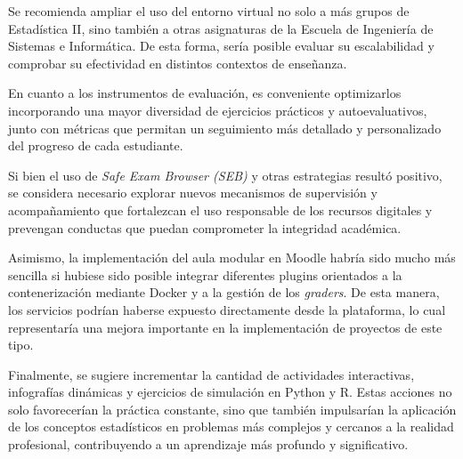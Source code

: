 \documentclass[letter,oneside,12pt,spanish]{report}
\begin{document}
Se recomienda ampliar el uso del entorno virtual no solo a más grupos de Estadística II, sino también a otras asignaturas de la Escuela de Ingeniería de Sistemas e Informática. De esta forma, sería posible evaluar su escalabilidad y comprobar su efectividad en distintos contextos de enseñanza.

En cuanto a los instrumentos de evaluación, es conveniente optimizarlos incorporando una mayor diversidad de ejercicios prácticos y autoevaluativos, junto con métricas que permitan un seguimiento más detallado y personalizado del progreso de cada estudiante.

Si bien el uso de \textit{Safe Exam Browser (SEB)} y otras estrategias resultó positivo, se considera necesario explorar nuevos mecanismos de supervisión y acompañamiento que fortalezcan el uso responsable de los recursos digitales y prevengan conductas que puedan comprometer la integridad académica.

Asimismo, la implementación del aula modular en Moodle habría sido mucho más sencilla si hubiese sido posible integrar diferentes plugins orientados a la contenerización mediante Docker y a la gestión de los \textit{graders}. De esta manera, los servicios podrían haberse expuesto directamente desde la plataforma, lo cual representaría una mejora importante en la implementación de proyectos de este tipo.

Finalmente, se sugiere incrementar la cantidad de actividades interactivas, infografías dinámicas y ejercicios de simulación en Python y R. Estas acciones no solo favorecerían la práctica constante, sino que también impulsarían la aplicación de los conceptos estadísticos en problemas más complejos y cercanos a la realidad profesional, contribuyendo a un aprendizaje más profundo y significativo.

\newpage

%
%

\printbibliography

\nocite{poniszewska-maranda, burns-kubernetes, torres-bosch-microservicios, armstrong2015,kubevirtio, docker2023, kubelet-doc, namespace-article}
\newpage
\end{document}
